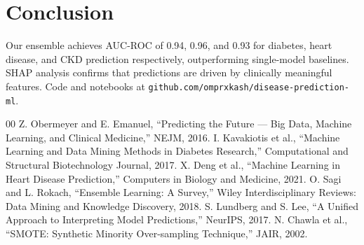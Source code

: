 \documentclass[conference]{IEEEtran}
\begin{document}
\section{Conclusion}

Our ensemble achieves AUC-ROC of 0.94, 0.96, and 0.93 for diabetes, heart disease, and CKD prediction respectively, outperforming single-model baselines. SHAP analysis confirms that predictions are driven by clinically meaningful features. Code and notebooks at \texttt{github.com/omprxkash/disease-prediction-ml}.

\begin{thebibliography}{00}
 Z. Obermeyer and E. Emanuel, ``Predicting the Future — Big Data, Machine Learning, and Clinical Medicine,'' NEJM, 2016.
 I. Kavakiotis et al., ``Machine Learning and Data Mining Methods in Diabetes Research,'' Computational and Structural Biotechnology Journal, 2017.
 X. Deng et al., ``Machine Learning in Heart Disease Prediction,'' Computers in Biology and Medicine, 2021.
 O. Sagi and L. Rokach, ``Ensemble Learning: A Survey,'' Wiley Interdisciplinary Reviews: Data Mining and Knowledge Discovery, 2018.
 S. Lundberg and S. Lee, ``A Unified Approach to Interpreting Model Predictions,'' NeurIPS, 2017.
 N. Chawla et al., ``SMOTE: Synthetic Minority Over-sampling Technique,'' JAIR, 2002.
\end{thebibliography}
\end{document}
